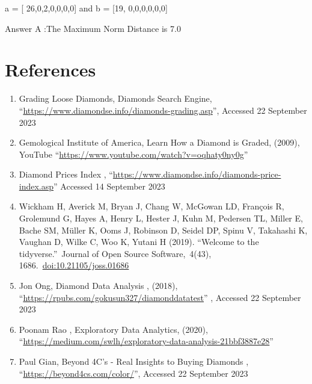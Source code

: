 \documentclass[
]{article}
\begin{document}
a = {[} 26,0,2,0,0,0,0{]} and b = {[}19, 0,0,0,0,0,0{]}

Answer A :The Maximum Norm Distance is 7.0

\hypertarget{references}{%
\section{References}\label{references}}

\begin{enumerate}
\def\labelenumi{\arabic{enumi})}
\item
  Grading Loose Diamonds, Diamonds Search Engine,
  ``\url{https://www.diamondse.info/diamonds-grading.asp}'', Accessed 22
  September 2023
\item
  Gemological Institute of America, Learn How a Diamond is Graded,
  (2009), YouTube ``\url{https://www.youtube.com/watch?v=oqhaty0ny0g}''
\item
  Diamond Prices Index ,
  ``\url{https://www.diamondse.info/diamonds-price-index.asp}'' Accessed
  14 September 2023
\item
  Wickham H, Averick M, Bryan J, Chang W, McGowan LD, François R,
  Grolemund G, Hayes A, Henry L, Hester J, Kuhn M, Pedersen TL, Miller
  E, Bache SM, Müller K, Ooms J, Robinson D, Seidel DP, Spinu V,
  Takahashi K, Vaughan D, Wilke C, Woo K, Yutani H (2019). ``Welcome to
  the tidyverse.''~Journal of Open Source Software,~4(43),
  1686.~\url{doi:10.21105/joss.01686}
\item
  Jon Ong, Diamond Data Analysis , (2018),
  ``\url{https://rpubs.com/gokusun327/diamonddatatest}'' , Accessed 22
  September 2023
\item
  Poonam Rao , Exploratory Data Analytics, (2020),
  ``\url{https://medium.com/swlh/exploratory-data-analysis-21bbf3887e28}''
\item
  Paul Gian, Beyond 4C's - Real Insights to Buying Diamonds ,
  ``\url{https://beyond4cs.com/color/}'', Accessed 22 September 2023
\end{enumerate}
\end{document}
